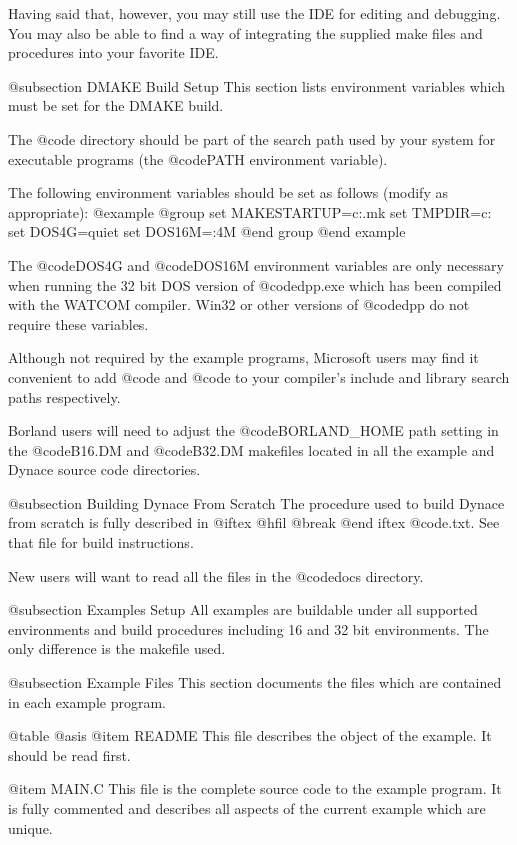Having said that, however, you may still use the IDE for editing and
debugging.  You may also be able to find a way of integrating the
supplied make files and procedures into your favorite IDE.

@subsection DMAKE Build Setup
This section lists environment variables which must be set for the
DMAKE build.

The @code{\DYANCE\BIN} directory should be part of the search path used
by your system for executable programs (the @code{PATH} environment
variable).

The following environment variables should be set as follows (modify as
appropriate):
@example
@group
set MAKESTARTUP=c:\dynace\utils\startup.mk
set TMPDIR=c:\tmp
set DOS4G=quiet
set DOS16M=:4M
@end group
@end example

The @code{DOS4G} and @code{DOS16M} environment variables are only necessary
when running the 32 bit DOS version of @code{dpp.exe} which has been
compiled with the WATCOM compiler.  Win32 or other versions of @code{dpp}
do not require these variables.

Although not required by the example programs, Microsoft users may find
it convenient to add @code{\DYNACE\INCLUDE} and @code{\DYNACE\LIB} to
your compiler's include and library search paths respectively.

Borland users will need to adjust the @code{BORLAND_HOME} path setting
in the @code{B16.DM} and @code{B32.DM} makefiles located in all the
example and Dynace source code directories.


@subsection Building Dynace From Scratch
The procedure used to build Dynace from scratch is fully described
in 
@iftex
@hfil @break 
@end iftex
@code{\DYNACE\DOCS\BUILD.txt}.  See that file for build instructions.

New users will want to read all the files in the @code{docs} directory.


@subsection Examples Setup
All examples are buildable under all supported environments and build
procedures including 16 and 32 bit environments.  The only difference is
the makefile used.



@subsection Example Files
This section documents the files which are contained in each example
program.

@table @asis
@item README
This file describes the object of the example.  It should be read
first.

@item MAIN.C
This file is the complete source code to the example program.  It is
fully commented and describes all aspects of the current example which
are unique.

